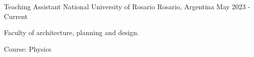 

\begin{cventries}

  \cventry
    {Teaching Assistant} %
    {National University of Rosario} %
    {Rosario, Argentina} %
    {May 2023 - Current} %
    {
      \begin{cvitems} %
        \item[] {Faculty of architecture, planning and design.}
        \item[] {Course: Physics}
      \end{cvitems}
    }

\end{cventries}
